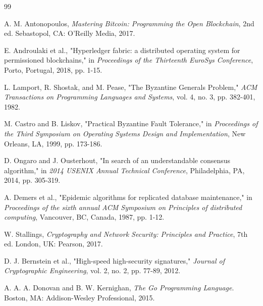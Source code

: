 \documentclass[12pt,a4paper]{article}
\begin{document}
\renewcommand{\refname}{Tài liệu tham khảo}
\begin{thebibliography}{99}

A. M. Antonopoulos, \textit{Mastering Bitcoin: Programming the Open Blockchain}, 2nd ed. Sebastopol, CA: O'Reilly Media, 2017.

E. Androulaki et al., "Hyperledger fabric: a distributed operating system for permissioned blockchains," in \textit{Proceedings of the Thirteenth EuroSys Conference}, Porto, Portugal, 2018, pp. 1-15.

L. Lamport, R. Shostak, and M. Pease, "The Byzantine Generals Problem," \textit{ACM Transactions on Programming Languages and Systems}, vol. 4, no. 3, pp. 382-401, 1982.

M. Castro and B. Liskov, "Practical Byzantine Fault Tolerance," in \textit{Proceedings of the Third Symposium on Operating Systems Design and Implementation}, New Orleans, LA, 1999, pp. 173-186.

D. Ongaro and J. Ousterhout, "In search of an understandable consensus algorithm," in \textit{2014 USENIX Annual Technical Conference}, Philadelphia, PA, 2014, pp. 305-319.

A. Demers et al., "Epidemic algorithms for replicated database maintenance," in \textit{Proceedings of the sixth annual ACM Symposium on Principles of distributed computing}, Vancouver, BC, Canada, 1987, pp. 1-12.

W. Stallings, \textit{Cryptography and Network Security: Principles and Practice}, 7th ed. London, UK: Pearson, 2017.

D. J. Bernstein et al., "High-speed high-security signatures," \textit{Journal of Cryptographic Engineering}, vol. 2, no. 2, pp. 77-89, 2012.

A. A. A. Donovan and B. W. Kernighan, \textit{The Go Programming Language}. Boston, MA: Addison-Wesley Professional, 2015.

\end{thebibliography}
\end{document}

